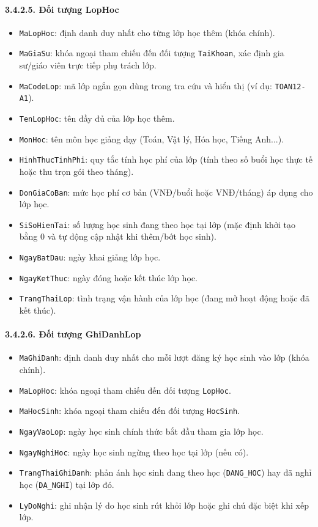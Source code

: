 \documentclass[12pt,a4paper]{article}
\begin{document}
\paragraph{3.4.2.5. Đối tượng LopHoc}\mbox{}
\begin{itemize}\setlength{\itemsep}{2pt}\setlength{\parskip}{0pt}
    \item \texttt{MaLopHoc}: định danh duy nhất cho từng lớp học thêm (khóa chính).
    \item \texttt{MaGiaSu}: khóa ngoại tham chiếu đến đối tượng \texttt{TaiKhoan}, xác định gia sư/giáo viên trực tiếp phụ trách lớp.
    \item \texttt{MaCodeLop}: mã lớp ngắn gọn dùng trong tra cứu và hiển thị (ví dụ: \texttt{TOAN12-A1}).
    \item \texttt{TenLopHoc}: tên đầy đủ của lớp học thêm.
    \item \texttt{MonHoc}: tên môn học giảng dạy (Toán, Vật lý, Hóa học, Tiếng Anh...).
    \item \texttt{HinhThucTinhPhi}: quy tắc tính học phí của lớp (tính theo số buổi học thực tế hoặc thu trọn gói theo tháng).
    \item \texttt{DonGiaCoBan}: mức học phí cơ bản (VNĐ/buổi hoặc VNĐ/tháng) áp dụng cho lớp học.
    \item \texttt{SiSoHienTai}: số lượng học sinh đang theo học tại lớp (mặc định khởi tạo bằng 0 và tự động cập nhật khi thêm/bớt học sinh).
    \item \texttt{NgayBatDau}: ngày khai giảng lớp học.
    \item \texttt{NgayKetThuc}: ngày đóng hoặc kết thúc lớp học.
    \item \texttt{TrangThaiLop}: tình trạng vận hành của lớp học (đang mở hoạt động hoặc đã kết thúc).
\end{itemize}

\paragraph{3.4.2.6. Đối tượng GhiDanhLop}\mbox{}
\begin{itemize}\setlength{\itemsep}{2pt}\setlength{\parskip}{0pt}
    \item \texttt{MaGhiDanh}: định danh duy nhất cho mỗi lượt đăng ký học sinh vào lớp (khóa chính).
    \item \texttt{MaLopHoc}: khóa ngoại tham chiếu đến đối tượng \texttt{LopHoc}.
    \item \texttt{MaHocSinh}: khóa ngoại tham chiếu đến đối tượng \texttt{HocSinh}.
    \item \texttt{NgayVaoLop}: ngày học sinh chính thức bắt đầu tham gia lớp học.
    \item \texttt{NgayNghiHoc}: ngày học sinh ngừng theo học tại lớp (nếu có).
    \item \texttt{TrangThaiGhiDanh}: phản ánh học sinh đang theo học (\texttt{DANG\_HOC}) hay đã nghỉ học (\texttt{DA\_NGHI}) tại lớp đó.
    \item \texttt{LyDoNghi}: ghi nhận lý do học sinh rút khỏi lớp hoặc ghi chú đặc biệt khi xếp lớp.
\end{itemize}
\end{document}
